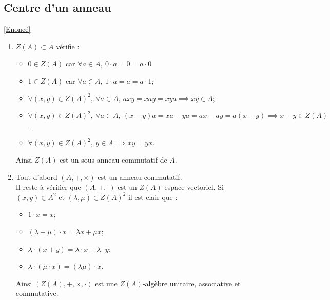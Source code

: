\documentclass[8pt]{book}
\begin{document}
	\subsection{Centre d'un anneau }
	\label{Centre d'un anneau corrigé}
	\textcolor{blue}{\hyperref[Centre d'un anneau]{[Enoncé]}}\\
	\begin{enumerate}[leftmargin=*]
		\item $Z(A)\subset A$ vérifie :
		\begin{itemize}
			\item $0\in Z(A)$ car $\forall a\in A,\ 0\cdot a=0=a\cdot 0$
			\item $1\in Z(A)$ car $\forall a\in A,\ 1\cdot a=a=a\cdot 1$;
			\item $\forall (x,y)\in Z(A)^2,\ \forall a\in A,\ axy=xay=xya\implies xy\in A$;
			\item $\forall (x,y)\in Z(A)^2,\ \forall a\in A,\ (x-y)a=xa-ya=ax-ay=a(x-y)\implies x-y\in Z(A)$.
			\item $\forall (x,y)\in Z(A)^2,\ y\in A\implies xy=yx$.
		\end{itemize}
		Ainsi $Z(A)$ est un sous-anneau commutatif de $A$.
		\item Tout d'abord $(A,+,\times)$ est un anneau commutatif.\\
		Il reste à vérifier que $(A,+,\cdot)$ est un $Z(A)$-espace vectoriel. Si $(x,y)\in A^2$ et $(\lambda,\mu)\in Z(A)^2$ il est clair que :
		\begin{itemize}
			\item $1\cdot x=x$;
			\item $(\lambda+\mu)\cdot x=\lambda x+\mu x$;
			\item $\lambda\cdot(x+y)=\lambda\cdot x+\lambda \cdot y$;
			\item $\lambda\cdot(\mu\cdot x)=(\lambda\mu)\cdot x$.
		\end{itemize}
		Ainsi $(Z(A),+,\times,\cdot)$ est une $Z(A)$-algèbre unitaire, associative et commutative.
	\end{enumerate}
	
\end{document}
